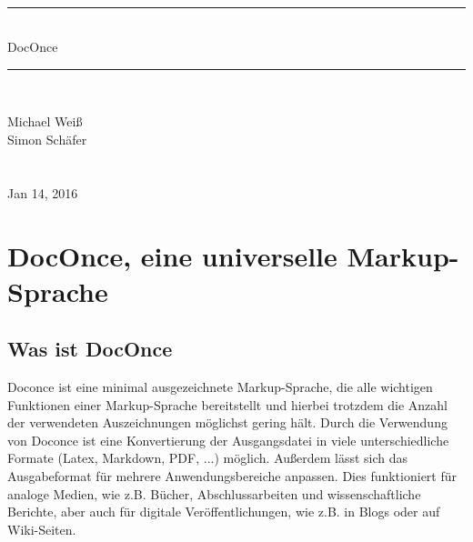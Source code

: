 \documentclass[%
oneside,                 %
final,                   %
chapterprefix=true,      %
open=right,              %
10pt]{book}
\begin{document}






\thispagestyle{empty}
\hbox{\ \ }
\vfill
\begin{center}
{\huge{\bfseries{
\begin{spacing}{1.25}
{\rule{\linewidth}{0.5mm}} \\[0.4cm]
{DocOnce}
\\[0.4cm] {\rule{\linewidth}{0.5mm}} \\[1.5cm]
\end{spacing}
}}}


\vspace{0.5cm}

{\Large\textsf{Michael Weiß${}^{}$}}\\ [3mm]

{\Large\textsf{Simon Schäfer${}^{}$}}\\ [3mm]

\ \\ [2mm]


\ \\ [10mm]
{\large\textsf{Jan 14, 2016}}

\end{center}
\vfill
\clearpage

\tableofcontents


\vspace{1cm} %




\chapter{DocOnce, eine universelle Markup-Sprache}
\section{Was ist DocOnce}
Doconce ist eine minimal ausgezeichnete Markup-Sprache, die alle wichtigen Funktionen einer Markup-Sprache bereitstellt und hierbei trotzdem die Anzahl der verwendeten Auszeichnungen möglichst gering hält. Durch die Verwendung von Doconce ist eine Konvertierung der Ausgangsdatei in viele unterschiedliche Formate (Latex, Markdown, PDF, ...) möglich. Außerdem lässt sich das Ausgabeformat für mehrere Anwendungsbereiche anpassen. Dies funktioniert für analoge Medien, wie z.B. Bücher, Abschlussarbeiten und wissenschaftliche Berichte, aber auch für digitale Veröffentlichungen, wie z.B. in Blogs oder auf Wiki-Seiten.
\end{document}
